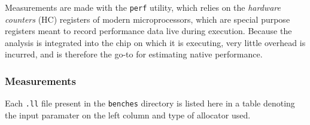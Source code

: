 \documentclass{article}
\begin{document}
Measurements are made with the \lstinline!perf! utility, which relies on the \textit{hardware counters} (HC) registers of modern microprocessors, which are special purpose registers meant to record performance data live during execution. Because the analysis is integrated into the chip on which it is executing, very little overhead is incurred, and is therefore the go-to for estimating native performance.



\subsubsection{Measurements}

Each \lstinline!.ll! file present in the \lstinline!benches! directory is listed here in a table denoting the input paramater on the left column and type of allocator used.








%
\end{document}
